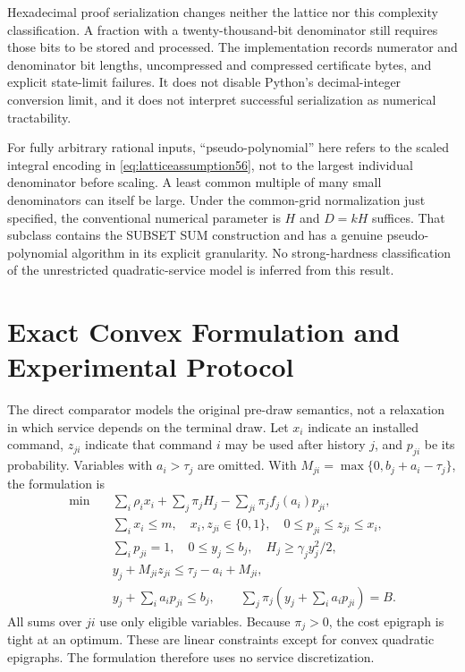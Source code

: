 \documentclass[11pt,letterpaper]{article}
\theoremstyle{definition}\newtheorem{remark}[theorem]{Remark}
\begin{document}
Hexadecimal proof serialization changes neither the lattice nor this complexity classification. A fraction with a twenty-thousand-bit denominator still requires those bits to be stored and processed. The implementation records numerator and denominator bit lengths, uncompressed and compressed certificate bytes, and explicit state-limit failures. It does not disable Python's decimal-integer conversion limit, and it does not interpret successful serialization as numerical tractability.

For fully arbitrary rational inputs, ``pseudo-polynomial'' here refers to the scaled integral encoding in \eqref{eq:latticeassumption56}, not to the largest individual denominator before scaling. A least common multiple of many small denominators can itself be large. Under the common-grid normalization just specified, the conventional numerical parameter is $H$ and $D=kH$ suffices. That subclass contains the SUBSET SUM construction and has a genuine pseudo-polynomial algorithm in its explicit granularity. No strong-hardness classification of the unrestricted quadratic-service model is inferred from this result.
\section{Exact Convex Formulation and Experimental Protocol}\label{sec:form59}
The direct comparator models the original pre-draw semantics, not a relaxation in which service depends on the terminal draw. Let $x_i$ indicate an installed command, $z_{ji}$ indicate that command $i$ may be used after history $j$, and $p_{ji}$ be its probability. Variables with $a_i>\tau_j$ are omitted. With $M_{ji}=\max\{0,b_j+a_i-\tau_j\}$, the formulation is
\begin{align}
 \min\quad &\sum_i\rho_i x_i+\sum_j\pi_jH_j-\sum_{ji}\pi_j f_j(a_i)p_{ji},\label{eq:micp59}\\
 &\sum_i x_i\leq m,\quad x_i,z_{ji}\in\{0,1\},\quad 0\leq p_{ji}\leq z_{ji}\leq x_i,\\
 &\sum_i p_{ji}=1,\quad 0\leq y_j\leq b_j,\quad H_j\geq\gamma_j y_j^2/2,\\
 &y_j+M_{ji}z_{ji}\leq\tau_j-a_i+M_{ji},\\
 &y_j+\sum_i a_i p_{ji}\leq b_j,\qquad
 \sum_j\pi_j\left(y_j+\sum_i a_i p_{ji}\right)=B.\nonumber
\end{align}
All sums over $ji$ use only eligible variables. Because $\pi_j>0$, the cost epigraph is tight at an optimum. These are linear constraints except for convex quadratic epigraphs. The formulation therefore uses no service discretization.
\end{document}
